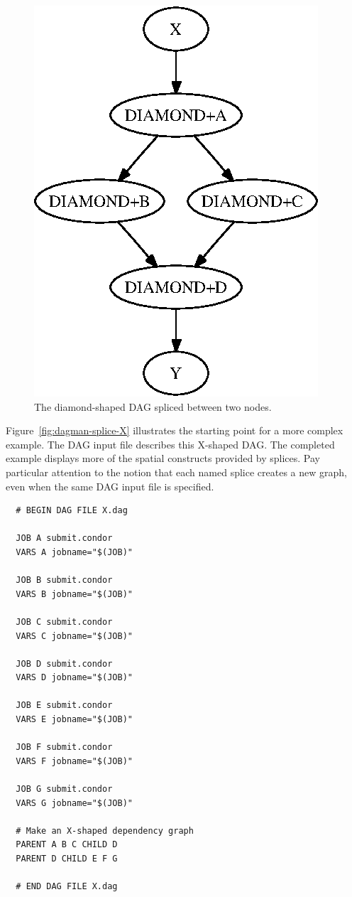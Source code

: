 \begin{figure}
\centering
\includegraphics{user-man/splice-simple.eps}
\caption{\label{fig:dagman-splice-simple} The diamond-shaped DAG spliced between two nodes.}
\end{figure}

Figure~\ref{fig:dagman-splice-X} illustrates the starting point
for a more complex example.
The DAG input file  describes this X-shaped DAG.
The completed example displays more of
the spatial constructs provided by splices.
Pay particular attention to the notion that each named splice creates a
new graph, even when the same DAG input file is specified.


\begin{verbatim}
  # BEGIN DAG FILE X.dag

  JOB A submit.condor
  VARS A jobname="$(JOB)"

  JOB B submit.condor
  VARS B jobname="$(JOB)"

  JOB C submit.condor
  VARS C jobname="$(JOB)"

  JOB D submit.condor
  VARS D jobname="$(JOB)"

  JOB E submit.condor
  VARS E jobname="$(JOB)"

  JOB F submit.condor
  VARS F jobname="$(JOB)"

  JOB G submit.condor
  VARS G jobname="$(JOB)"

  # Make an X-shaped dependency graph
  PARENT A B C CHILD D
  PARENT D CHILD E F G

  # END DAG FILE X.dag
\end{verbatim}

